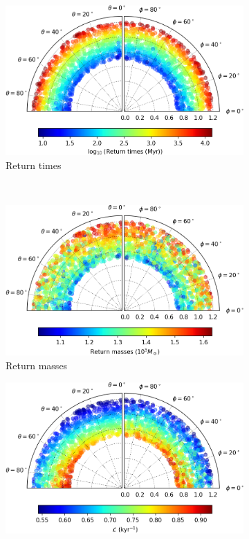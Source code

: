 \begin{figure}[h]
    \centering
    \begin{subfigure}[t]{0.4\textwidth}
        \includegraphics[width = \textwidth]{"../Files/Week 13/images/5_time"}
        \caption{Return times}
    \end{subfigure}
    ~ 
    \begin{subfigure}[t]{0.4\textwidth}
        \includegraphics[width=\textwidth]{"../Files/Week 13/images/5_mass"}
        \caption{Return masses}
    \end{subfigure}
    \begin{subfigure}[t]{0.4\textwidth}
        \includegraphics[width=\textwidth]{"../Files/Week 13/images/5_lyapunov"}

\end{subfigure}
\end{figure}
